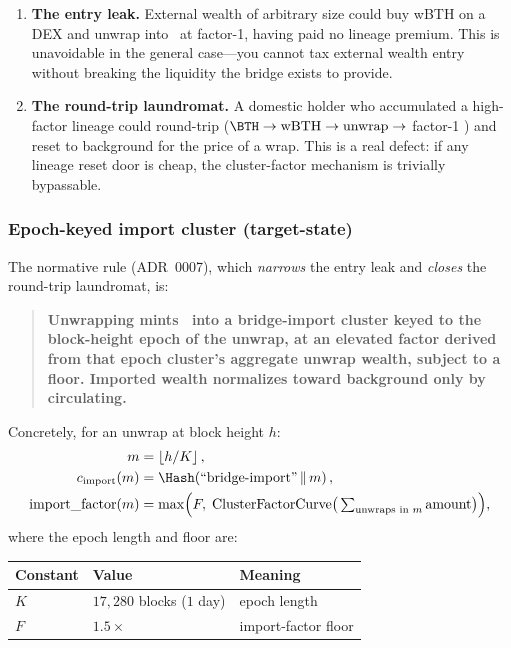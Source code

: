 \begin{enumerate}
  \item \textbf{The entry leak.} External wealth of arbitrary size could buy
    wBTH on a DEX and unwrap into \Botho\ at factor-1, having paid no lineage
    premium. This is unavoidable in the general case---you cannot tax external
    wealth entry without breaking the liquidity the bridge exists to provide.
  \item \textbf{The round-trip laundromat.} A domestic holder who accumulated a
    high-factor lineage could round-trip
    ($\BTH \to \text{wBTH} \to \text{unwrap} \to$ factor-1 \BTH) and reset to
    background for the price of a wrap. This is a real defect: if any lineage
    reset door is cheap, the cluster-factor mechanism is trivially bypassable.
\end{enumerate}

\subsubsection{Epoch-keyed import cluster (target-state)}

The normative rule (ADR~0007), which \emph{narrows} the entry leak and
\emph{closes} the round-trip laundromat, is:

\begin{quote}
\textbf{Unwrapping mints \BTH\ into a bridge-import cluster keyed to the
block-height epoch of the unwrap, at an elevated factor derived from that epoch
cluster's aggregate unwrap wealth, subject to a floor. Imported wealth
normalizes toward background only by circulating.}
\end{quote}

Concretely, for an unwrap at block height $h$:
\begin{align}
m &= \left\lfloor h / K \right\rfloor, \label{eq:bridge:epoch}\\
c_{\mathrm{import}}(m) &= \Hash\!\left(\text{``bridge-import''} \,\|\, m\right), \label{eq:bridge:cluster}\\
\mathrm{import\_factor}(m) &= \max\!\Big(F,\; \mathrm{ClusterFactorCurve}\big(\textstyle\sum_{\text{unwraps in }m} \mathrm{amount}\big)\Big), \label{eq:bridge:importfactor}
\end{align}
where the epoch length and floor are:
\begin{center}
\begin{tabular}{lll}
\toprule
\textbf{Constant} & \textbf{Value} & \textbf{Meaning} \\
\midrule
$K$ & $17{,}280$ blocks ($1$ day) & epoch length \\ %
$F$ & $1.5\times$ & import-factor floor \\ %
\bottomrule
\end{tabular}
\end{center}

